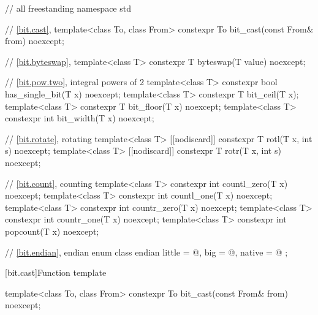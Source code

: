 \begin{codeblock}
// all freestanding
namespace std {
  // \ref{bit.cast}, 
  template<class To, class From>
    constexpr To bit_cast(const From& from) noexcept;

  // \ref{bit.byteswap}, 
  template<class T>
    constexpr T byteswap(T value) noexcept;

  // \ref{bit.pow.two}, integral powers of 2
  template<class T>
    constexpr bool has_single_bit(T x) noexcept;
  template<class T>
    constexpr T bit_ceil(T x);
  template<class T>
    constexpr T bit_floor(T x) noexcept;
  template<class T>
    constexpr int bit_width(T x) noexcept;

  // \ref{bit.rotate}, rotating
  template<class T>
    [[nodiscard]] constexpr T rotl(T x, int s) noexcept;
  template<class T>
    [[nodiscard]] constexpr T rotr(T x, int s) noexcept;

  // \ref{bit.count}, counting
  template<class T>
    constexpr int countl_zero(T x) noexcept;
  template<class T>
    constexpr int countl_one(T x) noexcept;
  template<class T>
    constexpr int countr_zero(T x) noexcept;
  template<class T>
    constexpr int countr_one(T x) noexcept;
  template<class T>
    constexpr int popcount(T x) noexcept;

  // \ref{bit.endian}, endian
  enum class endian {
    little = @\seebelow@,
    big    = @\seebelow@,
    native = @\seebelow@
  };
}
\end{codeblock}

[bit.cast]{Function template }

%
\begin{itemdecl}
template<class To, class From>
  constexpr To bit_cast(const From& from) noexcept;
\end{itemdecl}

